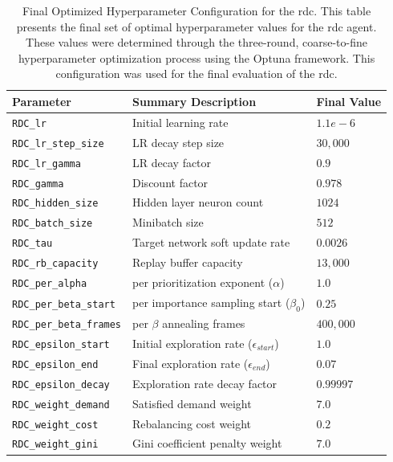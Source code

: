 \begin{table}[!htb]
    \centering
    \begin{tabularx}{\textwidth}{lXl}
        \toprule
        \textbf{Parameter} & \textbf{Summary Description} & \textbf{Final Value} \\
        \midrule
        \texttt{RDC\_lr} & Initial learning rate & $1.1e-6$ \\
        \texttt{RDC\_lr\_step\_size} & LR decay step size & $30,000$ \\
        \texttt{RDC\_lr\_gamma} & LR decay factor & $0.9$ \\
        \texttt{RDC\_gamma} & Discount factor & $0.978$\\
        \midrule
        \texttt{RDC\_hidden\_size} & Hidden layer neuron count & $1024$ \\
        \texttt{RDC\_batch\_size} & Minibatch size & $512$ \\
        \texttt{RDC\_tau} & Target network soft update rate & $0.0026$ \\
        \midrule
        \texttt{RDC\_rb\_capacity} & Replay buffer capacity & $13,000$\\
        \texttt{RDC\_per\_alpha} & \gls{per} prioritization exponent ($\alpha$) & $1.0$\\
        \texttt{RDC\_per\_beta\_start} & \gls{per} importance sampling start ($\beta_0$) & $0.25$\\
        \texttt{RDC\_per\_beta\_frames} & \gls{per} $\beta$ annealing frames & $400,000$\\
        \midrule
        \texttt{RDC\_epsilon\_start} & Initial exploration rate ($\epsilon_{start}$) & $1.0$\\
        \texttt{RDC\_epsilon\_end} & Final exploration rate ($\epsilon_{end}$) & $0.07$\\
        \texttt{RDC\_epsilon\_decay} & Exploration rate decay factor & $0.99997$\\
        \midrule
        \texttt{RDC\_weight\_demand} & Satisfied demand weight & $7.0$ \\
        \texttt{RDC\_weight\_cost} & Rebalancing cost weight & $0.2$ \\
        \texttt{RDC\_weight\_gini} & Gini coefficient penalty weight & $7.0$ \\
        \bottomrule
    \end{tabularx}
    \caption{Final Optimized Hyperparameter Configuration for the \gls{rdc}. This table presents the final set of optimal hyperparameter values for the \gls{rdc} agent. These values were determined through the three-round, coarse-to-fine hyperparameter optimization process using the Optuna framework. This configuration was used for the final evaluation of the \gls{rdc}. }
    \label{tab:rdc_final_hyperparameters}
\end{table}

